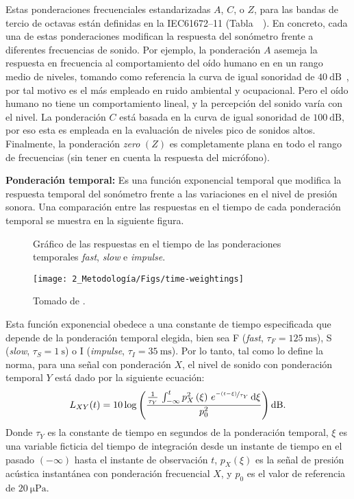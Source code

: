 Estas ponderaciones frecuenciales estandarizadas $A$, $C$, o $Z$, para las bandas de tercio de octavas están definidas en la \mbox{IEC61672--11} (\mbox{Tabla }~\citeyear{IEC_TC29_2013_1}).
En concreto, cada una de estas ponderaciones modifican la respuesta del sonómetro frente a diferentes frecuencias de sonido.
Por ejemplo, la ponderación $A$ asemeja la respuesta en frecuencia al comportamiento del oído humano en en un rango medio de niveles, tomando como referencia la curva de igual sonoridad de $\qty{40}{\dB}$~\citep{Fletcher1933}, por tal motivo es el más empleado en ruido ambiental y ocupacional.
Pero el oído humano no tiene un comportamiento lineal, y la percepción del sonido varía con el nivel.
La ponderación $C$ está basada en la curva de igual sonoridad de $\qty{100}{\dB}$, por eso esta es empleada en la evaluación de niveles pico de sonidos altos.
Finalmente, la ponderación \emph{zero} $(Z)$ es completamente plana en todo el rango de frecuencias (sin tener en cuenta la respuesta del micrófono).

\textbf{Ponderación temporal:} Es una función exponencial temporal que modifica la respuesta temporal del sonómetro frente a las variaciones en el nivel de presión sonora.
Una comparación entre las respuestas en el tiempo de cada ponderación temporal se muestra en la siguiente figura.
%
\begin{figure}[!h]
    \caption{Gráfico de las respuestas en el tiempo de las ponderaciones temporales \emph{fast}, \emph{slow} e \emph{impulse}.}
    \label{fig:time_weightings}
    \centering
    \texttt{[image: 2\_Metodología/Figs/time-weightings]}
    \caption*{\footnotesize Tomado de .}
\end{figure}

Esta función exponencial obedece a una constante de tiempo especificada que depende de la ponderación temporal elegida, bien sea F (\emph{fast}, $\tau_F = \qty{125}{\ms}$), S (\emph{slow}, $\tau_S = \qty{1}{\s}$) o I (\emph{impulse}, $\tau_I = \qty{35}{\ms}$).
Por lo tanto, tal como lo define la norma, para una señal con ponderación $X$, el nivel de sonido con ponderación temporal $Y$ está dado por la siguiente ecuación:
%
\begin{equation}
    \label{eq:time_weighted_level}
    L_{XY}(t) = 10 \log\left(\frac{\frac{1}{\tau_Y}\,
    \int_{-\infty}^t p_X^2\left(\xi\right)\,e^{\nicefrac{-\left(t - \xi\right)}{\tau_Y}}\,\mathrm{d}\xi}
    {p_0^2}\right) \unit{\dB}.
\end{equation}
%
Donde $\tau_Y$ es la constante de tiempo en segundos de la ponderación temporal, $\xi$ es una variable ficticia del tiempo de integración desde un instante de tiempo en el pasado $(-\infty)$ hasta el instante de observación $t$, $p_X\left(\xi\right)$ es la señal de presión acústica instantánea con ponderación frecuencial $X$, y $p_0$ es el valor de referencia de $\qty{20}{\micro\Pa}$.

